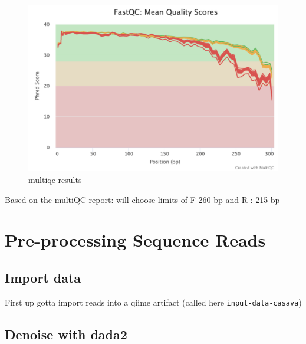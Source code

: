 \documentclass[]{book}
\newenvironment{Shaded}{\begin{snugshade}}{\end{snugshade}}
\newcommand{\ExtensionTok}[1]{#1}
\newcommand{\NormalTok}[1]{#1}
\newcommand{\StringTok}[1]{\textcolor[rgb]{0.31,0.60,0.02}{#1}}
\begin{document}
\begin{figure}
\centering
\includegraphics{figs/fastqc_per_base_sequence_quality_plot.png}
\caption{multiqc results}
\end{figure}

Based on the multiQC report: will choose limits of F 260 bp and R : 215 bp

\hypertarget{pre-processing-sequence-reads}{%
\chapter{Pre-processing Sequence Reads}\label{pre-processing-sequence-reads}}

\hypertarget{import-data}{%
\section{Import data}\label{import-data}}

First up gotta import reads into a qiime artifact (called here \texttt{input-data-casava})

\begin{Shaded}
\end{Shaded}

\hypertarget{denoise-with-dada2}{%
\section{Denoise with dada2}\label{denoise-with-dada2}}
\end{document}
